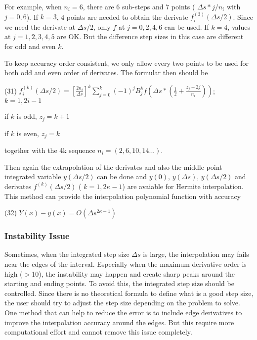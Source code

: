 For example, when $ n_i = 6 $, there are 6 sub-\/steps and 7 points ( $ \Delta s*j/n_i $ with $j=0,6$). If $ k = 3 $, 4 points are needed to obtain the derivate $ f_i^{(3)}(\Delta s/2) $. Since we need the derivate at $ \Delta s/2 $, only $ f $ at $ j = 0,2,4,6 $ can be used. If $ k = 4 $, values at $ j= 1,2,3,4,5$ are OK. But the difference step sizes in this case are different for odd and even $ k$.

To keep accuracy order consistent, we only allow every two points to be used for both odd and even order of derivates. The formular then should be

(31) $ f_i^{(k)}(\Delta s/2) = \left[ \frac{2n_i}{\Delta s} \right]^k \sum_{j=0}^k (-1)^j B_j^k f(\Delta s*(\frac{1}{2}+\frac{z_j-2j}{n_i})) $; $ k=1,2i-1 $
\begin{DoxyItemize}
\item if $k$ is odd, $ z_j = k+1 $
\item if $k$ is even, $ z_j = k $
\end{DoxyItemize}

together with the 4k sequence $ n_i =(2, 6, 10, 14 ...) $.

Then again the extrapolation of the derivates and also the middle point integrated variable $ y(\Delta s/2) $ can be done and $ y(0) $, $ y(\Delta s) $, $ y(\Delta s/2) $ and derivates $ f^{(k)}(\Delta s/2) $ ( $ k =1,2\kappa-1 $) are avaiable for Hermite interpolation. This method can provide the interpolation polynomial function with accuracy

(32) $ Y(x) - y(x) = O(\Delta s^{2\kappa-1}) $\hypertarget{index_gbs_dense_instab}{}\subsubsection{Instability Issue}\label{index_gbs_dense_instab}
Sometimes, when the integrated step size $ \Delta s $ is large, the interpolation may fails near the edges of the interval. Especially when the maximum derivative order is high ($>$10), the instability may happen and create sharp peaks around the starting and ending points. To avoid this, the integrated step size should be controlled. Since there is no theoretical formula to define what is a good step size, the user should try to adjust the step size depending on the problem to solve. One method that can help to reduce the error is to include edge derivatives to improve the interpolation accuracy around the edges. But this require more computational effort and cannot remove this issue completely.

